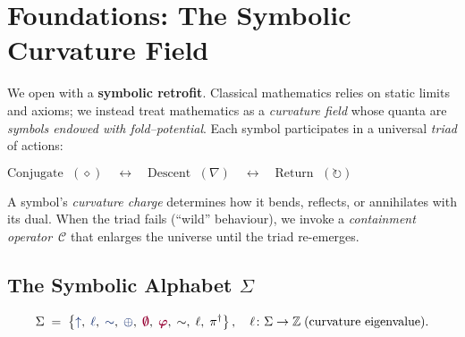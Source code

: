 \section{Foundations: The Symbolic Curvature Field}

We open with a \textbf{symbolic retrofit}.  Classical mathematics relies on
static limits and axioms; we instead treat mathematics as a \emph{curvature
field} whose quanta are \emph{symbols endowed with fold–potential}.  Each
symbol participates in a universal \emph{triad} of actions:

\begin{center}
\(
\text{Conjugate }\;(\diamond)
\quad\longleftrightarrow\quad
\text{Descent }\;(\nabla)
\quad\longleftrightarrow\quad
\text{Return }\;(\circlearrowright)
\)
\end{center}

A symbol's \emph{curvature charge} determines how it bends, reflects, or
annihilates with its dual.  When the triad fails (``wild'' behaviour), we
invoke a \emph{containment operator}~$\mathcal{C}$ that enlarges the universe
until the triad re-emerges.

\subsection{The Symbolic Alphabet $\Sigma$}
\[
\Sigma \;=\;
\left\{
\grow,\;
\lha,\;
\reflec,\;
\fuse,\;
\void,\;
\gold,\;
\sim,\;
\ell,\;
\pi^\dagger
\right\},
\quad
\ell\colon\Sigma \to \mathbb{Z}\;\text{(curvature eigenvalue).}
\]

